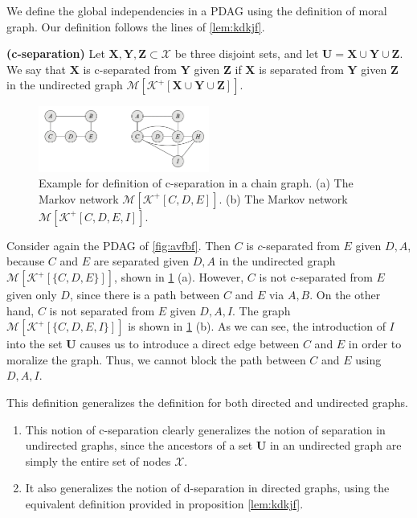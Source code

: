 \documentclass{article}
\newcommand{\bfs}[1]{\textbf{({#1}) }}
\begin{document}
We define the global independencies in a PDAG using the definition of moral graph. Our definition follows the lines of \cref{lem:kdkjf}.
\begin{defa}\bfs{c-separation}
Let $\boldsymbol{X}, \boldsymbol{Y}, \boldsymbol{Z} \subset \mathcal{X}$ be three disjoint sets, and let $\boldsymbol{U}=\boldsymbol{X} \cup \boldsymbol{Y} \cup \boldsymbol{Z}$. We say that $\boldsymbol{X}$ is c-separated from $\boldsymbol{Y}$ given $\boldsymbol{Z}$ if $\boldsymbol{X}$ is separated from $\boldsymbol{Y}$ given $\boldsymbol{Z}$ in the undirected graph $\mathcal{M}\left[\mathcal{K}^{+}[\boldsymbol{X} \cup \boldsymbol{Y} \cup \boldsymbol{Z}]\right] .$
\end{defa}
\begin{exma}
\begin{figure}[H]
    \centering
    \includegraphics[width=0.5\textwidth]{Figs/a26.png}
    \caption{ Example for definition of c-separation in a chain graph. (a) The Markov network $\mathcal{M}\left[\mathcal{K}^{+}[C, D, E]\right]$. (b) The Markov network $\mathcal{M}\left[\mathcal{K}^{+}[C, D, E, I]\right]$.}
    \label{fig:dlal}
\end{figure}
Consider again the PDAG of \cref{fig:avfbf}. Then $C$ is $c$-separated from $E$ given $D, A$, because $C$ and $E$ are separated given $D, A$ in the undirected graph $\mathcal{M}\left[\mathcal{K}^{+}[\{C, D, E\}]\right]$, shown in \cref{fig:dlal} (a). However, $C$ is not c-separated from $E$ given only $D$, since there is a path between $C$ and $E$ via $A, B$. On the other hand, $C$ is not separated from $E$ given $D, A, I$. The graph $\mathcal{M}\left[\mathcal{K}^{+}[\{C, D, E, I\}]\right]$ is shown in \cref{fig:dlal} (b). As we can see, the introduction of $I$ into the set $\boldsymbol{U}$ causes us to introduce a direct edge between $C$ and $E$ in order to moralize the graph. Thus, we cannot block the path between $C$ and $E$ using $D, A, I$.
\end{exma}
\begin{rema}
\begin{rema}This definition generalizes the definition for both directed and undirected graphs.
\begin{enumerate}
    \item This notion of c-separation clearly generalizes the notion of separation in undirected graphs, since the ancestors of a set $\boldsymbol{U}$ in an undirected graph are simply the entire set of nodes $\mathcal{X}$.
    \item It also generalizes the notion of d-separation in directed graphs, using the equivalent definition provided in proposition \cref{lem:kdkjf}.
\end{enumerate}
\end{rema}
\end{rema}
\end{document}

